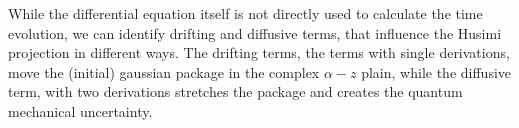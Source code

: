 While the differential equation itself is not directly used to calculate the time evolution, we can identify drifting and diffusive terms, that influence the Husimi projection in different ways.
The drifting terms, the terms with single derivations, move the (initial) gaussian package in the complex $\alpha-z$ plain, while the diffusive term, with two derivations stretches the package and creates the quantum mechanical uncertainty.